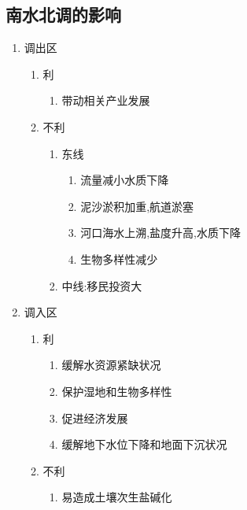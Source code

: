 \documentclass[a4paper]{article}
\begin{document}
    \subsection{南水北调的影响}
    \begin{enumerate}
        \item 调出区
        \begin{enumerate}
            \item 利
            \begin{enumerate}
                \item 带动相关产业发展
            \end{enumerate}
            \item 不利
            \begin{enumerate}
                \item 东线
                \begin{enumerate}
                    \item 流量减小水质下降
                    \item 泥沙淤积加重,航道淤塞
                    \item 河口海水上溯,盐度升高,水质下降
                    \item 生物多样性减少
                \end{enumerate}
                \item 中线:移民投资大
            \end{enumerate}
        \end{enumerate}
        \item 调入区
        \begin{enumerate}
            \item 利
            \begin{enumerate}
                \item 缓解水资源紧缺状况
                \item 保护湿地和生物多样性
                \item 促进经济发展
                \item 缓解地下水位下降和地面下沉状况
            \end{enumerate}
            \item 不利
            \begin{enumerate}
                \item 易造成土壤次生盐碱化
            \end{enumerate}
        \end{enumerate}
    \end{enumerate}
\end{document}
